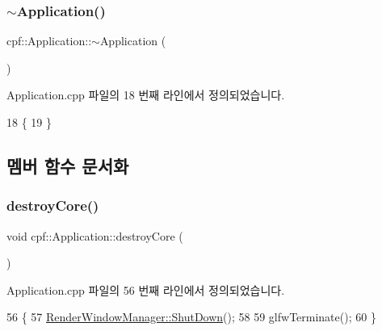 \subsubsection{\texorpdfstring{$\sim$\+Application()}{~Application()}}
{\footnotesize\ttfamily cpf\+::\+Application\+::$\sim$\+Application (\begin{DoxyParamCaption}{ }\end{DoxyParamCaption})\hspace{0.3cm}{\ttfamily [virtual]}}



Application.\+cpp 파일의 18 번째 라인에서 정의되었습니다.


\begin{DoxyCode}
18                               \{
19     \}
\end{DoxyCode}


\subsection{멤버 함수 문서화}
\mbox{\label{classcpf_1_1_application_aa65f415f1e0866cab063d83ab428ebbc}} 
\subsubsection{\texorpdfstring{destroy\+Core()}{destroyCore()}}
{\footnotesize\ttfamily void cpf\+::\+Application\+::destroy\+Core (\begin{DoxyParamCaption}{ }\end{DoxyParamCaption})\hspace{0.3cm}{\ttfamily [private]}}



Application.\+cpp 파일의 56 번째 라인에서 정의되었습니다.


\begin{DoxyCode}
56                                   \{
57         \hyperlink{classcpf_1_1_t_module_a61452801c61e2546b75a7a6a545e82ee}{RenderWindowManager::ShutDown}();
58 
59         glfwTerminate();
60     \}
\end{DoxyCode}
\mbox{\label{classcpf_1_1_application_a676898244f732414360ced11ed65379c}} 
